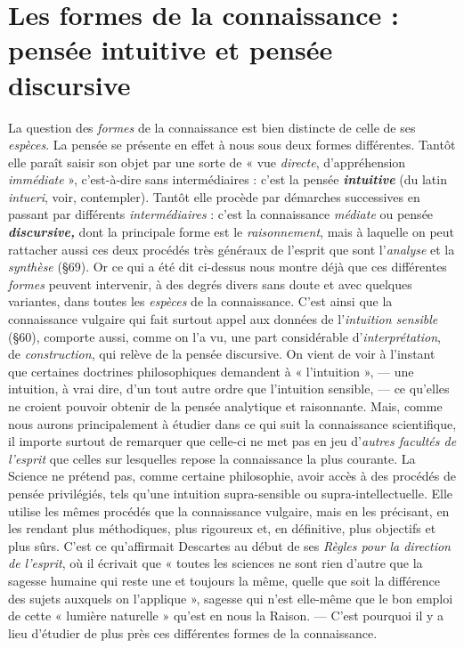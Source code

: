 \section{Les formes de la connaissance : pensée intuitive et pensée
discursive}%
La question des {\it formes} de la connaissance est bien
distincte de celle de ses {\it espèces}. La pensée se présente en effet à nous
sous deux formes différentes. Tantôt elle paraît saisir son objet par
une sorte de « vue {\it directe}, d’appréhension {\it immédiate} », c’est-à-dire
sans intermédiaires : c’est la pensée \textbf{\textit {intuitive}} (du latin {\it intueri}, voir,
contempler). Tantôt elle procède par démarches successives en passant
par différents {\it intermédiaires} : c’est la connaissance {\it médiate} ou pensée
\textbf{\textit {discursive,}} dont la principale forme est le {\it raisonnement}, mais à laquelle
on peut rattacher aussi ces deux procédés très généraux de l’esprit que
sont l'{\it analyse} et la {\it synthèse} (\S 69). Or ce qui a été dit ci-dessus nous
montre déjà que ces différentes {\it formes} peuvent intervenir, à des degrés
divers sans doute et avec quelques variantes, dans toutes les {\it espèces}
de la connaissance. C’est ainsi que la connaissance vulgaire qui fait
surtout appel aux données de l'{\it intuition sensible} (\S 60), comporte
aussi, comme on l’a vu, une part considérable d'{\it interprétation}, de
{\it construction}, qui relève de la pensée discursive. On vient de voir à
l'instant que certaines doctrines philosophiques demandent à « l’intuition »,
— une intuition, à vrai dire, d’un tout autre ordre que
l'intuition sensible, — ce qu’elles ne croient pouvoir obtenir de la
pensée analytique et raisonnante. Mais, comme nous aurons principalement
à étudier dans ce qui suit la connaissance scientifique,
il importe surtout de remarquer que celle-ci ne met pas en jeu d’{\it autres
facultés de l'esprit} que celles sur lesquelles repose la connaissance la
plus courante. La Science ne prétend pas, comme certaine philosophie,
avoir accès à des procédés de pensée privilégiés, tels qu’une intuition
supra-sensible ou supra-intellectuelle. Elle utilise les mêmes procédés
que la connaissance vulgaire, mais en les précisant, en les rendant
plus méthodiques, plus rigoureux et, en définitive, plus objectifs et plus
sûrs. C’est ce qu’affirmait Descartes au début de ses {\it Règles pour la
direction de l'esprit}, où il écrivait que « toutes les sciences ne sont
rien d’autre que la sagesse humaine qui reste une et toujours la même,
quelle que soit la différence des sujets auxquels on l’applique »,
sagesse qui n’est elle-même que le bon emploi de cette « lumière naturelle »
qu’est en nous la Raison. — C’est pourquoi il y a lieu d'étudier
de plus près ces différentes formes de la connaissance.

